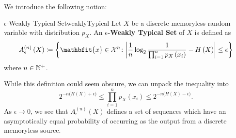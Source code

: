 \documentclass[math]{amznotes}
\theoremstyle{remark}
\begin{document}
We introduce the following notion:
\begin{dfnbox}{$\epsilon$-Weakly Typical Set}{weaklyTypical}
    Let $X$ be a discrete memoryless random variable with distribution $p_X$. An {\color{red} \textbf{$\epsilon$-Weakly Typical Set}} of $X$ is defined as 
    \begin{equation*}
        A_{\epsilon}^{\left(n\right)}\left(X\right) \coloneqq \left\{\mathbfit{x} \in \mathcal{X}^n \colon \abs{\frac{1}{n}\log_2\frac{1}{\prod_{i = 1}^np_X\left(x_i\right)} - H\left(X\right)} \leq \epsilon\right\}
    \end{equation*}
    where $n \in \mathbb{N}^+$.
\end{dfnbox}
While this definition could seem obscure, we can unpack the inequality into 
\begin{equation*}
    2^{-n\bigl(H\left(X\right) + \epsilon\bigr)} \leq \prod_{i = 1}^np_X\left(x_i\right) \leq 2^{-n\bigl(H\left(X\right) - \epsilon\bigr)}.
\end{equation*}
As $\epsilon \to 0$, we see that $A_{\epsilon}^{\left(n\right)}\left(X\right)$ defines a set of sequences which have an asymptotically equal probability of occurring as the output from a discrete memoryless source.
\end{document}
